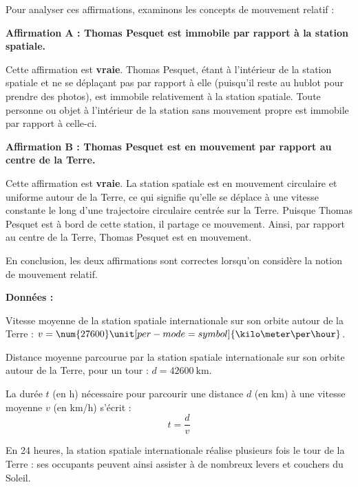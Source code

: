 \documentclass[answers]{exam}
\begin{document}
\begin{questions}
\begin{solution}
Pour analyser ces affirmations, examinons les concepts de mouvement relatif :

\begin{compactitem}
    \item \textbf{Affirmation A : Thomas Pesquet est immobile par rapport à la station spatiale.}
    
    Cette affirmation est \textbf{vraie}. Thomas Pesquet, étant à l'intérieur de la station spatiale et ne se déplaçant pas par rapport à elle (puisqu'il reste au hublot pour prendre des photos), est immobile relativement à la station spatiale. Toute personne ou objet à l'intérieur de la station sans mouvement propre est immobile par rapport à celle-ci.

    \item \textbf{Affirmation B : Thomas Pesquet est en mouvement par rapport au centre de la Terre.}

    Cette affirmation est \textbf{vraie}. La station spatiale est en mouvement circulaire et uniforme autour de la Terre, ce qui signifie qu'elle se déplace à une vitesse constante le long d'une trajectoire circulaire centrée sur la Terre. Puisque Thomas Pesquet est à bord de cette station, il partage ce mouvement. Ainsi, par rapport au centre de la Terre, Thomas Pesquet est en mouvement.
\end{compactitem}

En conclusion, les deux affirmations sont correctes lorsqu'on considère la notion de mouvement relatif.
\end{solution}

\question[4] \textbf{Données :}
  
  \begin{compactitem}
  \item Vitesse moyenne de la station spatiale internationale sur son orbite autour de la Terre : $v = \num{27600} \unit[per-mode = symbol]{\kilo\meter\per\hour}$.
  \item Distance moyenne parcourue par la station spatiale internationale sur son orbite autour de la Terre, pour un tour : $d = \SI{42600}{\kilo\meter}$.
  \item La durée $t$ (en h) nécessaire pour parcourir une distance $d$ (en km) à une vitesse moyenne $v$ (en \unit[per-mode = symbol]{\kilo\meter\per\hour}) s'écrit :
  \[
  t = \frac{d}{v}
  \]
  \end{compactitem}
  
  En 24 heures, la station spatiale internationale réalise plusieurs fois le tour de la Terre : ses occupants peuvent ainsi assister à de nombreux levers et couchers du Soleil.
  

\end{questions}
\end{document}
